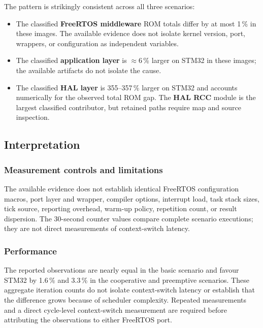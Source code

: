 The pattern is strikingly consistent across all three scenarios:

\begin{itemize}
  \item The classified \textbf{FreeRTOS middleware} ROM totals differ by at most 1\,\%
    in these images. The available evidence does not isolate kernel version, port, wrappers,
    or configuration as independent variables.
  \item The classified \textbf{application layer} is $\approx$6\,\% larger on STM32 in
    these images; the available artifacts do not isolate the cause.
  \item The classified \textbf{HAL layer} is 355--357\,\% larger on STM32 and accounts
    numerically for the observed total ROM gap. The \textbf{HAL RCC} module is the largest
    classified contributor, but retained paths require map and source inspection.
\end{itemize}

\subsection{Interpretation}
\label{sec:gd32-freertos-interp}

\subsubsection*{Measurement controls and limitations}
The available evidence does not establish identical FreeRTOS configuration macros, port
layer and wrapper, compiler options, interrupt load, task stack sizes, tick source,
reporting overhead, warm-up policy, repetition count, or result dispersion. The 30-second
counter values compare complete scenario executions; they are not direct measurements of
context-switch latency.

\subsubsection*{Performance}
The reported observations are nearly equal in the basic scenario and favour STM32 by
1.6\,\% and 3.3\,\% in the cooperative and preemptive scenarios. These aggregate iteration
counts do not isolate context-switch latency or establish that the difference grows because
of scheduler complexity. Repeated measurements and a direct cycle-level context-switch
measurement are required before attributing the observations to either FreeRTOS port.

